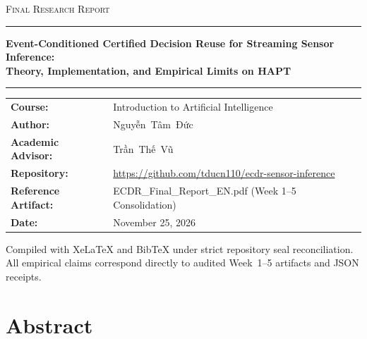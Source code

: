 \documentclass[11pt,oneside,a4paper]{report}
\newcommand{\code}[1]{{\small\upshape\ttfamily #1}}
\theoremstyle{remark}
\begin{document}
\begin{titlepage}
\thispagestyle{empty}
\centering
\vspace*{1.2cm}
{\large\scshape\color{teal} Final Research Report\par}
\vspace{0.6cm}
{\color{rulegray}\rule{\textwidth}{1.5pt}\par}
\vspace{1.0cm}
{\LARGE\bfseries\color{ink}
Event-Conditioned Certified Decision Reuse for Streaming Sensor Inference:\\[0.35em]
Theory, Implementation, and Empirical Limits on HAPT\par}
\vspace{1.0cm}
{\color{rulegray}\rule{\textwidth}{1.5pt}\par}
\vspace{1.8cm}

\begin{tabular}{@{}P{4.5cm}P{9.5cm}@{}}
\textbf{Course:} & Introduction to Artificial Intelligence \\
\textbf{Author:} & Nguyễn~Tâm~Đức \\
\textbf{Academic Advisor:} & Trần~Thế~Vũ \\
\textbf{Repository:} & \url{https://github.com/tducn110/ecdr-sensor-inference} \\
\textbf{Reference Artifact:} & \code{ECDR\_Final\_Report\_EN.pdf} (Week 1--5 Consolidation) \\
\textbf{Date:} & November 25, 2026 \\
\end{tabular}

\vfill
{\small\color{ink}
Compiled with XeLaTeX and BibTeX under strict repository seal reconciliation.\\
All empirical claims correspond directly to audited Week~1--5 artifacts and JSON receipts.
\par}
\end{titlepage}


\chapter*{Abstract}
\end{document}
